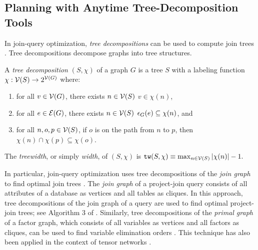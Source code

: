\subsection{Planning with Anytime Tree-Decomposition Tools}
\label{sec_td}

In join-query optimization, \emph{tree decompositions} can be used to compute join trees \cite{DKV02,MPPV04}.
Tree decompositions \cite{RS91} decompose graphs into tree structures.
\begin{definition}
	A \emph{tree decomposition} $(S, \chi)$ of a graph $G$ is a tree $S$ with a labeling function $\chi : \mathcal{V}(S) \to 2^{\mathcal{V}(G)}$ where:
	\begin{enumerate}[ref=\arabic*]
		\item for all $v \in \mathcal{V}(G)$, there exists $n \in \mathcal{V}(S)$ \st{} $v \in \chi(n)$,
		\item for all $e \in \mathcal{E}(G)$, there exists $n \in \mathcal{V}(S)$ \st{} $\epsilon_{G}(e) \subseteq \chi(n)$, and
		\item for all $n, o, p \in \mathcal{V}(S)$, if $o$ is on the path from $n$ to $p$, then $\chi(n) \cap \chi(p) \subseteq \chi(o)$. \label{prop_running_intersection}
	\end{enumerate}
	The \emph{treewidth}, or simply \emph{width}, of $(S, \chi)$ is $\texttt{\upshape tw}(S, \chi) \equiv \max_{n \in \mathcal{V}(S)} \left| \chi(n) \right| - 1.$
\end{definition}

In particular, join-query optimization uses tree decompositions of the \emph{join graph} to find optimal join trees \cite{DKV02,MPPV04}.
The \emph{join graph} of a project-join query consists of all attributes of a database as vertices and all tables as cliques.
In this approach, tree decompositions of the join graph of a query are used to find optimal project-join trees; see Algorithm 3 of \cite{MPPV04}.
Similarly, tree decompositions of the \emph{primal graph} of a factor graph, which consists of all variables as vertices and all factors as cliques, can be used to find variable elimination orders \cite{KDLD05}.
This technique has also been applied in the context of tensor networks \cite{morgenstern2008ltl,DDV19}.

